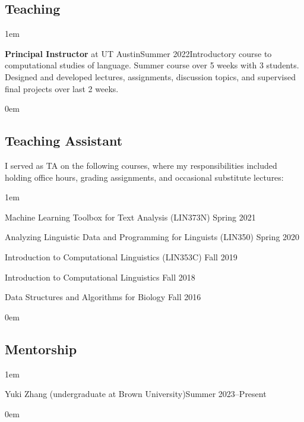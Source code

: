 \subsection{Teaching}
\vspace{-0.5\baselineskip}
\leftskip1em\relax

  {\textbf{Principal Instructor} at UT Austin}{Summer 2022}{}{Introductory course to computational studies of language. Summer course over 5 weeks with 3 students. Designed and developed lectures, assignments, discussion topics, and supervised final projects over last 2 weeks.}

\leftskip0em\relax
  
\subsection{Teaching Assistant}

\quad I served as TA on the following courses, where my responsibilities included holding office hours, grading assignments, and occasional substitute lectures:

\leftskip1em\relax

\vspace{0.5\baselineskip}

\textbullet\enspace Machine Learning Toolbox for Text Analysis ({\rmsc LIN373N}) \hfill Spring 2021

\textbullet\enspace Analyzing Linguistic Data and Programming for Linguists ({\rmsc LIN350}) \hfill Spring 2020

\textbullet\enspace Introduction to Computational Linguistics ({\rmsc LIN353C}) \hfill Fall 2019

\textbullet\enspace Introduction to Computational Linguistics \hfill Fall 2018

\textbullet\enspace Data Structures and Algorithms for Biology \hfill Fall 2016

\leftskip0em\relax

\subsection{Mentorship}
\vspace{-0.5\baselineskip}
\leftskip1em\relax

  {Yuki Zhang (undergraduate at Brown University)}{Summer 2023--Present}{}{}

\leftskip0em\relax
